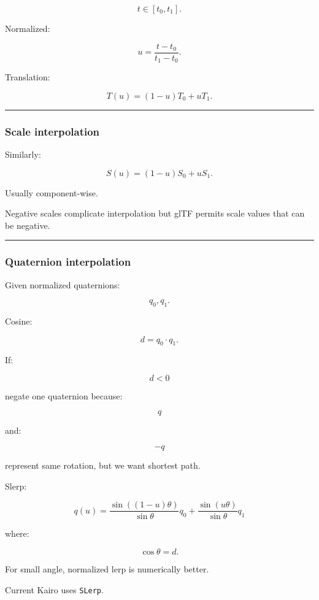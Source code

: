 \[
t\in[t_0,t_1].
\]

Normalized:

\[
u=
\frac{t-t_0}{t_1-t_0}.
\]

Translation:

\[
\boxed{
T(u)
=
(1-u)T_0+uT_1.
}
\]

\begin{center}\rule{0.5\linewidth}{0.5pt}\end{center}

\subsubsection{Scale interpolation}\label{scale-interpolation}

Similarly:

\[
\boxed{
S(u)
=
(1-u)S_0+uS_1.
}
\]

Usually component-wise.

Negative scales complicate interpolation but glTF permits scale values that can be negative.

\begin{center}\rule{0.5\linewidth}{0.5pt}\end{center}

\subsubsection{Quaternion interpolation}\label{quaternion-interpolation}

Given normalized quaternions:

\[
q_0,q_1.
\]

Cosine:

\[
d=q_0\cdot q_1.
\]

If:

\[
d<0
\]

negate one quaternion because:

\[
q
\]

and:

\[
-q
\]

represent same rotation, but we want shortest path.

Slerp:

\[
\boxed{
q(u)
=
\frac{
\sin((1-u)\theta)
}{
\sin\theta
}
q_0
+
\frac{
\sin(u\theta)
}{
\sin\theta
}
q_1
}
\]

where:

\[
\cos\theta=d.
\]

For small angle, normalized lerp is numerically better.

Current Kairo uses \texttt{SLerp}.


